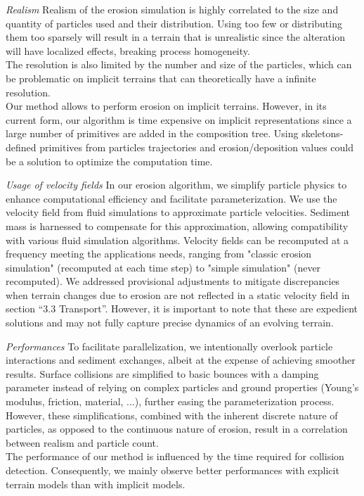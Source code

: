 \textit{Realism}
Realism of the erosion simulation is highly correlated to the size and quantity of particles used and their distribution. Using too few or distributing them too sparsely will result in a terrain that is unrealistic since the alteration will have localized effects, breaking process homogeneity. \\ 
The resolution is also limited by the number and size of the particles, which can be problematic on implicit terrains that can theoretically have a infinite resolution.\\
Our method allows to perform erosion on implicit terrains. However, in its current form, our algorithm is time expensive on implicit representations since a large number of primitives are added in the composition tree. Using skeletons-defined primitives \cite{Hong2013, Rigaudiere2000}%
 from particles trajectories and erosion/deposition values could be a solution to optimize the computation time.

\textit{Usage of velocity fields}
In our erosion algorithm, we simplify particle physics to enhance computational efficiency and facilitate parameterization. We use the velocity field from fluid simulations to approximate particle velocities. Sediment mass is harnessed to compensate for this approximation, allowing compatibility with various fluid simulation algorithms. Velocity fields can be recomputed at a frequency meeting the applications needs, ranging from "classic erosion simulation" (recomputed at each time step) to "simple simulation" (never recomputed). We addressed provisional adjustments to mitigate discrepancies when terrain changes due to erosion are not reflected in a static velocity field in section “3.3 Transport”. However, it is important to note that these are expedient solutions and may not fully capture precise dynamics of an evolving terrain. 

\textit{Performances}
To facilitate parallelization, we intentionally overlook particle interactions and sediment exchanges, albeit at the expense of achieving smoother results. Surface collisions are simplified to basic bounces with a damping parameter instead of relying on complex particles and ground properties (Young's modulus, friction, material, ...)\cite{Yan2020}, further easing the parameterization process. However, these simplifications, combined with the inherent discrete nature of particles, as opposed to the continuous nature of erosion, result in a correlation between realism and particle count. \\
The performance of our method is influenced by the time required for collision detection. Consequently, we mainly observe better performances with explicit terrain models than with implicit models. 

